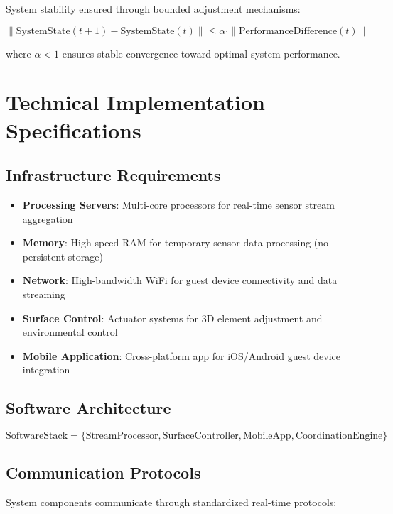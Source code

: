 \documentclass[12pt,a4paper]{article}
\begin{document}
System stability ensured through bounded adjustment mechanisms:

\begin{equation}
\|\text{SystemState}(t+1) - \text{SystemState}(t)\| \leq \alpha \cdot \|\text{PerformanceDifference}(t)\|
\end{equation}

where $\alpha < 1$ ensures stable convergence toward optimal system performance.

\section{Technical Implementation Specifications}

\subsection{Infrastructure Requirements}

\begin{itemize}
\item \textbf{Processing Servers}: Multi-core processors for real-time sensor stream aggregation
\item \textbf{Memory}: High-speed RAM for temporary sensor data processing (no persistent storage)
\item \textbf{Network}: High-bandwidth WiFi for guest device connectivity and data streaming
\item \textbf{Surface Control}: Actuator systems for 3D element adjustment and environmental control
\item \textbf{Mobile Application}: Cross-platform app for iOS/Android guest device integration
\end{itemize}

\subsection{Software Architecture}

\begin{equation}
\text{SoftwareStack} = \{\text{StreamProcessor}, \text{SurfaceController}, \text{MobileApp}, \text{CoordinationEngine}\}
\end{equation}

\subsection{Communication Protocols}

System components communicate through standardized real-time protocols:
\end{document}
